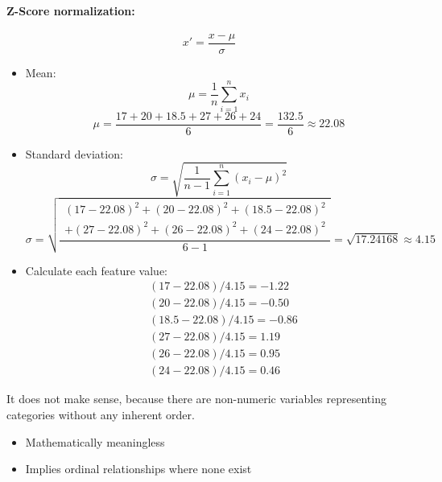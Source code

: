 \documentclass[12pt,a4paper]{article}
\begin{document}
\paragraph{Z-Score normalization:}
\begin{equation}
  x' = \frac{x - \mu}{\sigma}
\end{equation}

\begin{itemize}
  \item Mean:
        \begin{equation}
          \mu = \frac{1}{n} \sum_{i=1}^{n} x_i
        \end{equation}
        \begin{equation*}
          \mu = \frac{17+20+18.5+27+26+24}{6} = \frac{132.5}{6} \approx 22.08
        \end{equation*}
  \item Standard deviation:
        \begin{equation}
          \sigma = \sqrt{\frac{1}{n-1} \sum_{i=1}^{n} (x_i - \mu)^2}
        \end{equation}
        \begin{equation*}
          \sigma = \sqrt{
            \frac{
              \begin{split}
                (17-22.08)^2 + (20-22.08)^2 + (18.5-22.08)^2 \\
                + (27-22.08)^2 + (26-22.08)^2 + (24-22.08)^2
              \end{split}
            }{6-1}
          }
          = \sqrt{17.24168} \approx 4.15
        \end{equation*}
  \item Calculate each feature value:
        \begin{align*}
           & (17-22.08)/4.15 = -1.22   \\
           & (20-22.08)/4.15 = -0.50   \\
           & (18.5-22.08)/4.15 = -0.86 \\
           & (27-22.08)/4.15 = 1.19    \\
           & (26-22.08)/4.15 = 0.95    \\
           & (24-22.08)/4.15 = 0.46
        \end{align*}
\end{itemize}

It does not make sense, because there are non-numeric variables representing categories without any inherent order.
\begin{itemize}
  \item Mathematically meaningless
  \item Implies ordinal relationships where none exist
\end{itemize}
\end{document}
